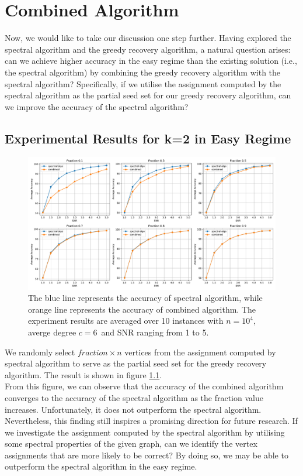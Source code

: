 \chapter{Combined Algorithm} \label{chapter 4}
Now, we would like to take our discussion one step further. Having explored the spectral algorithm and the greedy recovery algorithm, a natural question arises: can we achieve higher accuracy in the easy regime than the existing solution (i.e., the spectral algorithm) by combining the greedy recovery algorithm with the spectral algorithm? Specifically, if we utilise the assignment computed by the spectral algorithm as the partial seed set for our greedy recovery algorithm, can we improve the accuracy of the spectral algorithm?\\ 
\section{Experimental Results for k=2 in Easy Regime}
\begin{figure}[ht]
    \centering
    \includegraphics[width=1\linewidth]{Figures/combined_fitting_2.pdf}
    \caption[Combined Algorithm vs Spectral Algorithm]{The blue line represents the accuracy of spectral algorithm, while orange line represents the accuracy of combined algorithm. The experiment results are averaged over 10 instances with $n=10^4$, averge degree $c=6$\protect\footnotemark~and SNR ranging from 1 to 5.}
    \label{fig:combined}
\end{figure}
We randomly select $fraction\times n$ vertices from the assignment computed by spectral algorithm to serve as the partial seed set for the greedy recovery algorithm.  The result is shown in figure \ref{fig:combined}.\\
From this figure, we can observe that the accuracy of the combined algorithm converges to the accuracy of the spectral algorithm as the fraction value increases. Unfortunately, it does not outperform the spectral algorithm. Nevertheless, this finding still inspires a promising direction for future research. If we investigate the assignment computed by the spectral algorithm by utilising some spectral properties of the given graph, can we identify the vertex assignments that are more likely to be correct? By doing so, we may be able to outperform the spectral algorithm in the easy regime.
